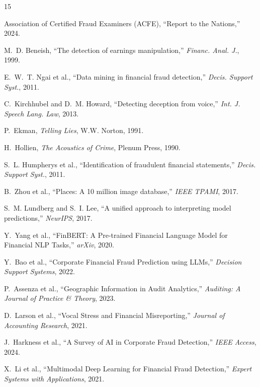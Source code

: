 \documentclass[conference]{IEEEtran}
\begin{document}
\begin{thebibliography}{15}

Association of Certified Fraud Examiners (ACFE), ``Report to the Nations,'' 2024.

M.~D. Beneish, ``The detection of earnings manipulation,'' \emph{Financ. Anal. J.}, 1999.

E.~W.~T. Ngai et al., ``Data mining in financial fraud detection,'' \emph{Decis. Support Syst.}, 2011.

C.~Kirchhubel and D.~M. Howard, ``Detecting deception from voice,'' \emph{Int. J. Speech Lang. Law}, 2013.

P.~Ekman, \emph{Telling Lies}, W.W. Norton, 1991.

H.~Hollien, \emph{The Acoustics of Crime}, Plenum Press, 1990.

S.~L. Humpherys et al., ``Identification of fraudulent financial statements,'' \emph{Decis. Support Syst.}, 2011.

B.~Zhou et al., ``Places: A 10 million image database,'' \emph{IEEE TPAMI}, 2017.

S.~M. Lundberg and S.~I. Lee, ``A unified approach to interpreting model predictions,'' \emph{NeurIPS}, 2017.

Y.~Yang et al., ``FinBERT: A Pre-trained Financial Language Model for Financial NLP Tasks,'' \emph{arXiv}, 2020.

Y.~Bao et al., ``Corporate Financial Fraud Prediction using LLMs,'' \emph{Decision Support Systems}, 2022.

P.~Assenza et al., ``Geographic Information in Audit Analytics,'' \emph{Auditing: A Journal of Practice \& Theory}, 2023.

D.~Larson et al., ``Vocal Stress and Financial Misreporting,'' \emph{Journal of Accounting Research}, 2021.

J.~Harkness et al., ``A Survey of AI in Corporate Fraud Detection,'' \emph{IEEE Access}, 2024.

X.~Li et al., ``Multimodal Deep Learning for Financial Fraud Detection,'' \emph{Expert Systems with Applications}, 2021.

\end{thebibliography}
\end{document}
